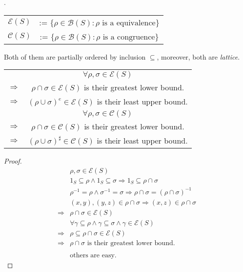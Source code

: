 \begin{Sym}.
    \begin{center}
        \begin{tabular}{c c}
            $\mathcal{E}(S)$ & := $\{\rho \in \mathcal{B}(S) : \rho \text{ is a equivalence}\}$    \\
            $\mathcal{C}(S)$ & := $\{\rho \in \mathcal{B}(S) : \rho \text{ is a congruence}\}$    \\ 
        \end{tabular}
    \end{center}
    Both of them are partially ordered by inclusion $\subseteq$, moreover, both are \emph{lattice}.

    \begin{center}
        \begin{tabular}{c c}
            & $\forall \rho, \sigma \in \mathcal{E}(S) $    \\
            $\Rightarrow $ & $\rho \cap \sigma \in \mathcal{E}(S)$  is their greatest lower bound.    \\
            $\Rightarrow $ & $(\rho \cup \sigma)^e \in \mathcal{E}(S)$ is their least upper bound.        \\ 
            & $\forall \rho, \sigma \in \mathcal{C}(S) $    \\
            $\Rightarrow $ & $\rho \cap \sigma \in \mathcal{C}(S) $ is their greatest lower bound.      \\
            $\Rightarrow $ & $(\rho \cup \sigma)^{\sharp} \in \mathcal{C}(S)$ is their least upper bound. \\
        \end{tabular}
    \end{center}

    \begin{proof}
        \begin{align*}
            & \rho, \sigma \in \mathcal{E}(S)   \\
            & 1_S \subseteq \rho \wedge 1_S \subseteq \sigma \Rightarrow 1_S    \subseteq \rho \cap \sigma \\
            & \rho^{-1}=\rho \wedge \sigma^{-1} = \sigma \Rightarrow \rho \cap \sigma = (\rho \cap \sigma)^{-1} \\
            & (x,y),(y,z) \in \rho \cap \sigma \Rightarrow (x,z) \in \rho \cap \sigma \\
            \Rightarrow& \rho \cap \sigma \in \mathcal{E}(S)    \\
            & \forall \gamma \subseteq \rho \wedge \gamma \subseteq \sigma \wedge \gamma \in \mathcal{E}(S) \\
            \Rightarrow& \rho \subseteq \rho \cap \sigma \in \mathcal{E}(S) \\
            \Rightarrow& \rho \cap \sigma \text{ is their greatest lower bound.}    \\
            & \\
            & \text{others are easy.}
        \end{align*}
    \end{proof}


\end{Sym}
